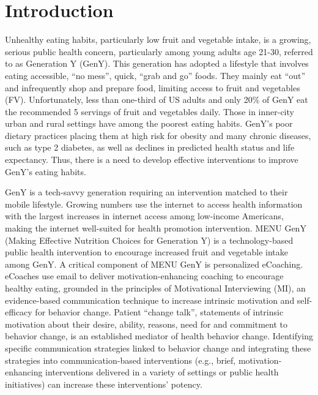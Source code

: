 \documentclass{amia}
\begin{document}
\section*{Introduction}
Unhealthy eating habits, particularly low fruit and vegetable intake, is a growing, serious public health concern, particularly among young adults age 21-30, referred to as Generation Y (GenY)\cite{blanck2008trends,centers2007fruit}. This generation has adopted a lifestyle that involves eating accessible, ``no mess'', quick, ``grab and go'' foods\cite{nebeling2007still,brug1999application}. They mainly eat ``out'' and infrequently shop and prepare food, limiting access to fruit and vegetables (FV)\cite{nelson2009improving,larson2006food}. Unfortunately, less than one-third of US adults\cite{blanck2008trends,ogden2006prevalence} and only 20\% of GenY\cite{blanck2008trends,american2006american,thompson2005dietary} eat the recommended 5 servings of fruit and vegetables daily. Those in inner-city urban and rural settings have among the poorest eating habits\cite{blanck2008trends,centers2007fruit,ogden2006prevalence,american2006american,thompson2005dietary}. GenY's poor dietary practices placing them at high risk for obesity and many chronic diseases, such as type 2 diabetes, as well as declines in predicted health status and life expectancy. Thus, there is a need to develop effective interventions to improve GenY's eating habits.

GenY is a tech-savvy generation requiring an intervention matched to their mobile lifestyle. Growing numbers use the internet to access health information with the largest increases in internet access among low-income Americans, making the internet well-suited for health promotion intervention\cite{strecher2007internet}. MENU GenY\cite{alexander2017motivations} (Making Effective Nutrition Choices for Generation Y) is a technology-based public health intervention to encourage increased fruit and vegetable intake among GenY. A critical component of MENU GenY is personalized eCoaching. eCoaches use email to deliver motivation-enhancing coaching to encourage healthy eating, grounded in the principles of Motivational Interviewing (MI), an evidence-based communication technique to increase intrinsic motivation and self-efficacy for behavior change\cite{miller2012motivational,miller2009ten,miller2009toward}. Patient ``change talk'', statements of intrinsic motivation about their desire, ability, reasons, need for and commitment to behavior change, is an established mediator of health behavior change\cite{apodaca2009mechanisms}. Identifying specific communication strategies linked to behavior change and integrating these strategies into communication-based interventions (e.g., brief, motivation-enhancing interventions delivered in a variety of settings or public health initiatives) can increase these interventions' potency.
\end{document}
